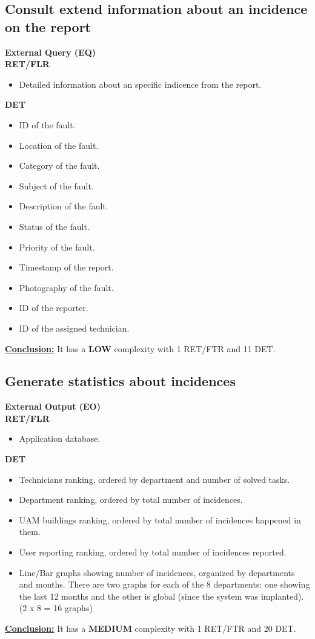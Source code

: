 \subsection{Consult extend information about an incidence on the report}
\textbf{External Query (EQ)} \\ 
\textbf{RET/FLR}
\begin{itemize}
\item Detailed information about an specific indicence from the report.
\end{itemize}
\textbf{DET}
\begin{itemize}
\item ID of the fault.
\item Location of the fault.
\item Category of the fault.
\item Subject of the fault.
\item Description of the fault.
\item Status of the fault.
\item Priority of the fault.
\item Timestamp of the report.
\item Photography of the fault.
\item ID of the reporter.
\item ID of the assigned technician.
\end{itemize}
\textbf{\underline{Conclusion:}} It has a \textbf{LOW} complexity with 1 RET/FTR and 11 DET.

\subsection{Generate statistics about incidences}
\textbf{External Output (EO)} \\ 
\textbf{RET/FLR}
\begin{itemize}
\item Application database.
\end{itemize}
\textbf{DET}
\begin{itemize}
\item Technicians ranking, ordered by department and number of solved tasks.
\item Department ranking, ordered by total number of incidences.
\item UAM buildings ranking, ordered by total number of incidences happened in them.
\item User reporting ranking, ordered by total number of incidences reported.
\item Line/Bar graphs showing number of incidences, organized by departments and months. There are two graphs for each of the 8 departments: one showing the last 12 months and the other is global (since the system was implanted). (2 x 8 = 16 graphs)
\end{itemize}
\textbf{\underline{Conclusion:}} It has a \textbf{MEDIUM} complexity with 1 RET/FTR and 20 DET.

